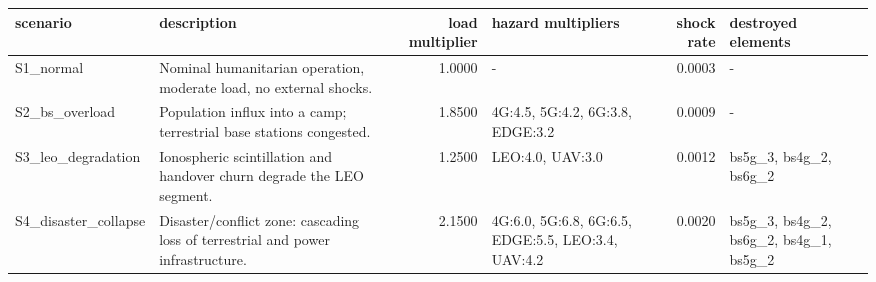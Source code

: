 \begin{tabular}{llrlrl}
\toprule
scenario & description & load multiplier & hazard multipliers & shock rate & destroyed elements \\
\midrule
S1\_normal & Nominal humanitarian operation, moderate load, no external shocks. & 1.0000 & - & 0.0003 & - \\
S2\_bs\_overload & Population influx into a camp; terrestrial base stations congested. & 1.8500 & 4G:4.5, 5G:4.2, 6G:3.8, EDGE:3.2 & 0.0009 & - \\
S3\_leo\_degradation & Ionospheric scintillation and handover churn degrade the LEO segment. & 1.2500 & LEO:4.0, UAV:3.0 & 0.0012 & bs5g\_3, bs4g\_2, bs6g\_2 \\
S4\_disaster\_collapse & Disaster/conflict zone: cascading loss of terrestrial and power infrastructure. & 2.1500 & 4G:6.0, 5G:6.8, 6G:6.5, EDGE:5.5, LEO:3.4, UAV:4.2 & 0.0020 & bs5g\_3, bs4g\_2, bs6g\_2, bs4g\_1, bs5g\_2 \\
\bottomrule
\end{tabular}
